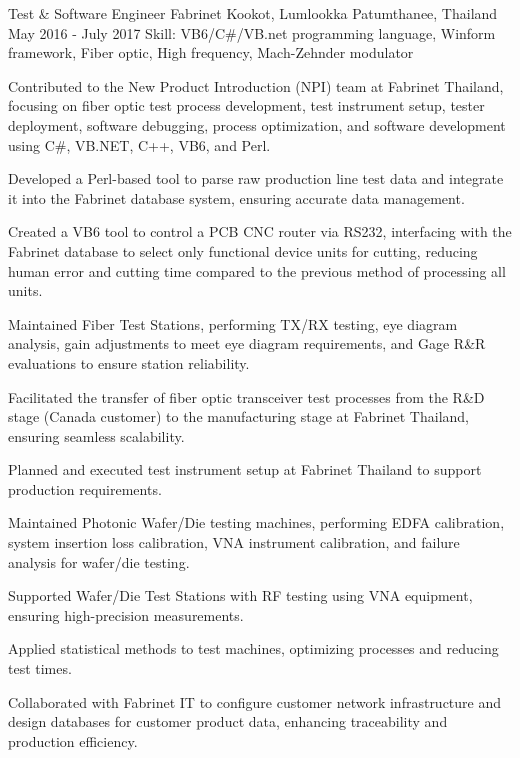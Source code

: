 \begin{cventries}
  \cventry
    {Test \& Software Engineer} %
    {Fabrinet} %
    {Kookot, Lumlookka Patumthanee, Thailand} %
    {May 2016 - July 2017} %
    {Skill: VB6/C\#/VB.net programming language, Winform framework, Fiber optic, High frequency, Mach-Zehnder modulator} %
    {
      \begin{cvitems} %
       \item {Contributed to the New Product Introduction (NPI) team at Fabrinet Thailand, focusing on fiber optic test process development, test instrument setup, tester deployment, software debugging, process optimization, and software development using C\#, VB.NET, C++, VB6, and Perl.}
       \item {Developed a Perl-based tool to parse raw production line test data and integrate it into the Fabrinet database system, ensuring accurate data management.}
       \item {Created a VB6 tool to control a PCB CNC router via RS232, interfacing with the Fabrinet database to select only functional device units for cutting, reducing human error and cutting time compared to the previous method of processing all units.}
       \item {Maintained Fiber Test Stations, performing TX/RX testing, eye diagram analysis, gain adjustments to meet eye diagram requirements, and Gage R\&R evaluations to ensure station reliability.}
       \item {Facilitated the transfer of fiber optic transceiver test processes from the R\&D stage (Canada customer) to the manufacturing stage at Fabrinet Thailand, ensuring seamless scalability.}
       \item {Planned and executed test instrument setup at Fabrinet Thailand to support production requirements.}
       \item {Maintained Photonic Wafer/Die testing machines, performing EDFA calibration, system insertion loss calibration, VNA instrument calibration, and failure analysis for wafer/die testing.}
       \item {Supported Wafer/Die Test Stations with RF testing using VNA equipment, ensuring high-precision measurements.}
       \item {Applied statistical methods to test machines, optimizing processes and reducing test times.}
       \item {Collaborated with Fabrinet IT to configure customer network infrastructure and design databases for customer product data, enhancing traceability and production efficiency.}
      \end{cvitems}
    }


\end{cventries}
